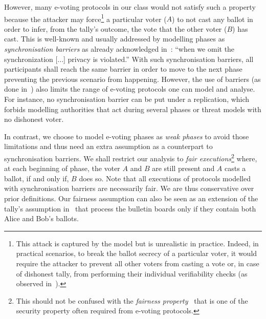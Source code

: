 However, many e-voting protocols in our class would not satisfy such a property because the attacker
may force\footnote{This attack is captured by the model but is
unrealistic in practice. Indeed, in practical scenarios, to break the
ballot secrecy of a particular voter,
it would require the attacker to prevent all other voters from casting a
vote or, in case of dishonest tally, from performing their individual verifiability checks (as observed in~\cite{cortier2018voting}).}
 a particular voter (\eg $A$) to not cast any ballot in order to infer, from the tally's outcome,
the vote that the other voter (\eg $B$) has cast.
This is well-known and usually addressed by modelling phases as {\em synchronisation barriers}
as already acknowledged in~\cite{KremerRyan2005}:
``when we omit the synchronization [...]
privacy is violated.'' With such synchronisation barriers, all participants shall reach the same barrier in order
to move to the next phase preventing the previous scenario from
happening.
However, the use of barriers (as done \eg
in~\cite{KremerRyan2005,DKR-jcs09,vote-CSF16,dreier2017beyond,vote-ifip})
also limits the range of e-voting protocols one can model and analyse.
For instance, no synchronisation barrier can be put under a replication,
which forbids modelling authorities that act during several phases or
threat models with no dishonest voter.


In contrast, we choose to model e-voting phases as {\em weak phases} to avoid those limitations
and thus need an extra assumption
as a counterpart to synchronisation barriers.
We shall restrict our analysis to {\em fair executions}\footnote{This
should not be confused with
the {\em fairness property}~\cite{vote-ESO16,cortier2013attacking} that is one of the security property often required from e-voting protocols.}
where, at each beginning of phase, the voter $A$ and $B$ are still present and $A$ casts a ballot,
if and only if, $B$ does so. Note that all executions
of protocols modelled with synchronisation barriers are necessarily fair. We are thus conservative over
prior definitions.
Our fairness assumption can also be seen as an extension of the tally's assumption in~\cite{vote-ESO16}
that process the bulletin boards only if they contain both Alice and Bob's ballots.

